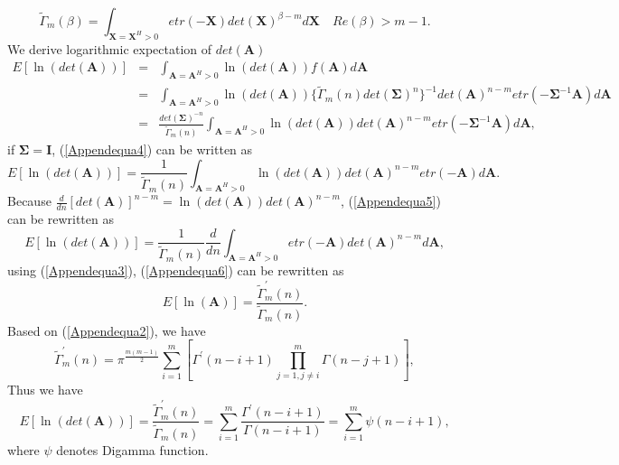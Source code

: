 \documentclass[12pt, draftclsnofoot, onecolumn]{IEEEtran}
\begin{document}
\begin{spacing}{2}
\begin{equation}
\tilde{\Gamma}_{m}(\beta)=\int_{\mathbf{X}=\mathbf{X}^{H}>0}etr(-\mathbf{X})det(\mathbf{X})^{\beta-m}d
\mathbf{X} \quad Re(\beta)>m-1.
\label{Appendequa3}
\end{equation}
We derive logarithmic expectation of $det(\mathbf{A})$
\begin{eqnarray}
\nonumber
E[\ln(det(\mathbf{A}))]&=&\int_{\mathbf{A}=\mathbf{A}^{H}>0}\ln(det(\mathbf{A}))f(\mathbf{A})d\mathbf{A}\\
\nonumber
&=&\int_{\mathbf{A}=\mathbf{A}^{H}>0}\ln(det(\mathbf{A}))\{\tilde{\Gamma}_{m}(n)det(\mathbf{\Sigma})^{n} \}^{-1}det(\mathbf{A})^{n-m}etr(-\mathbf{\Sigma}^{-1}\mathbf{A})d\mathbf{A}\\
&=&\frac{det(\mathbf{\Sigma})^{-n}}{\tilde{\Gamma}_{m}(n)}\int_{\mathbf{A}=\mathbf{A}^{H}>0}\ln(det(\mathbf{A}))det(\mathbf{A})^{n-m}etr(-\mathbf{\Sigma}^{-1}\mathbf{A})d\mathbf{A},
\label{Appendequa4}
\end{eqnarray}
if $\mathbf{\Sigma}=\mathbf{I}$, (\ref{Appendequa4}) can be written as 
\begin{equation}
E[\ln(det(\mathbf{A}))]=\frac{1}{\tilde{\Gamma}_{m}(n)}\int_{\mathbf{A}=\mathbf{A}^{H}>0}\ln(det(\mathbf{A}))det(\mathbf{A})^{n-m}etr(-\mathbf{A})d\mathbf{A}.
\label{Appendequa5}
\end{equation}
Because $\frac{d}{dn}[det(\mathbf{A})]^{n-m}=\ln(det(\mathbf{A}))det(\mathbf{A})^{n-m}$, (\ref{Appendequa5}) can be rewritten as
\begin{equation}
E[\ln(det(\mathbf{A}))]=\frac{1}{\tilde{\Gamma}_{m}(n)}\frac{d}{dn}\int_{\mathbf{A}=\mathbf{A}^{H}>0}etr(-\mathbf{A})det(\mathbf{A})^{n-m}d\mathbf{A},
\label{Appendequa6}
\end{equation}
using (\ref{Appendequa3}), (\ref{Appendequa6}) can be rewritten as 
\begin{equation}
E[\ln(\mathbf{A})]=\frac{\tilde{\Gamma}^{'}_{m}(n)}{\tilde{\Gamma}_{m}(n)}.
\label{Appendequa7}
\end{equation}
Based on (\ref{Appendequa2}), we have 
\begin{equation}
\tilde{\Gamma}^{'}_{m}(n)=\pi^{\frac{m(m-1)}{2}}\sum_{i=1}^{m}[\Gamma^{'}(n-i+1)\prod_{j=1,j\neq i }^{m}\Gamma(n-j+1)],
\end{equation}
Thus we have 
\begin{equation}
E[\ln(det(\mathbf{A}))]=\frac{\tilde{\Gamma}^{'}_{m}(n)}{\tilde{\Gamma}_{m}(n)}=\sum_{i=1}^{m}\frac{\Gamma^{'}(n-i+1)}{\Gamma(n-i+1)}=\sum_{i=1}^{m}\psi(n-i+1),
\label{Appendequa8}
\end{equation}
where $\psi$ denotes Digamma function.

\end{spacing}
\end{document}
